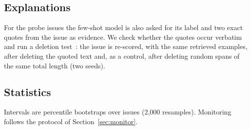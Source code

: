 \subsection{Explanations}
For the probe issues the few-shot model is also asked for its label and two exact quotes from the
issue as evidence. We check whether the quotes occur verbatim and run a deletion
test~\cite{deyoung2020eraser}: the issue is re-scored, with the same retrieved examples, after
deleting the quoted text and, as a control, after deleting random spans of the same total length
(two seeds).

\subsection{Statistics}
Intervals are percentile bootstraps over issues (2{,}000 resamples). Monitoring follows the protocol
of Section~\ref{sec:monitor}.
